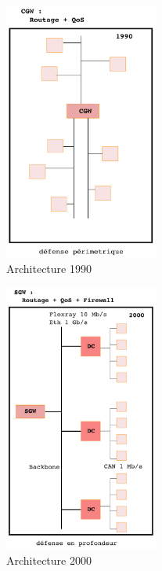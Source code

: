 \begin{figure}[h]
    \centering
	\includegraphics[width=0.45\textwidth]{schema/architecture/1990.pdf}
    \caption{Architecture 1990}
    \label{1990_archi}
\end{figure}

\begin{figure}[h]
    \centering
	\includegraphics[width=0.45\textwidth]{schema/architecture/2000.pdf}
    \caption{Architecture 2000}
    \label{2000_archi}
\end{figure}

